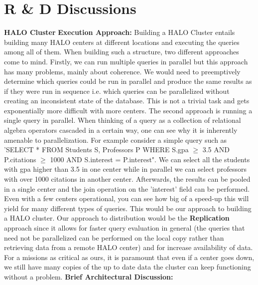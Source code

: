 \documentclass{article}
\begin{document}
\section{R \& D Discussions}

\textbf{HALO Cluster} \newline
\textbf{Execution Approach: }Building a HALO Cluster entails building many HALO centers at different locations and executing the queries among all of them. When building such a structure, two different approaches come to mind. Firstly, we can run multiple queries in parallel but this approach has many problems, mainly about coherence. We would need to preemptively determine which queries could be run in parallel and produce the same results as if they were run in sequence i.e. which queries can be parallelized without creating an inconsistent state of the database. This is not a trivial task and gets exponentially more difficult with more centers. The second approach is running a single query in parallel. When thinking of a query as a collection of relational algebra operators cascaded in a certain way, one can see why it is inherently amenable to parallelization. For example consider a simple query such as \newline 'SELECT * \newline FROM Students S, Professors P \newline WHERE S.gpa $\geq$ 3.5 AND P.citations $\geq$ 1000 AND S.interest = P.interest". \newline We can select all the students with gpa higher than 3.5 in one center while in parallel we can select professors with over 1000 citations in another center. Afterwards, the results can be pooled in a single center and the join operation on the 'interest' field can be performed. Even with a few centers operational, you can see how big of a speed-up this will yield for many different types of queries. This would be our approach to building a HALO cluster. Our approach to distribution would be the \textbf{Replication} approach since it allows for faster query evaluation in general (the queries that need not be parallelized can be performed on the local copy rather than retrieving data from a remote HALO center) and for increase availability of data. For a missions as critical as ours, it is paramount that even if a center goes down, we still have many copies of the up to date data the cluster can keep functioning without a problem. \newline
\textbf{Brief Architectural Discussion: }
\end{document}
